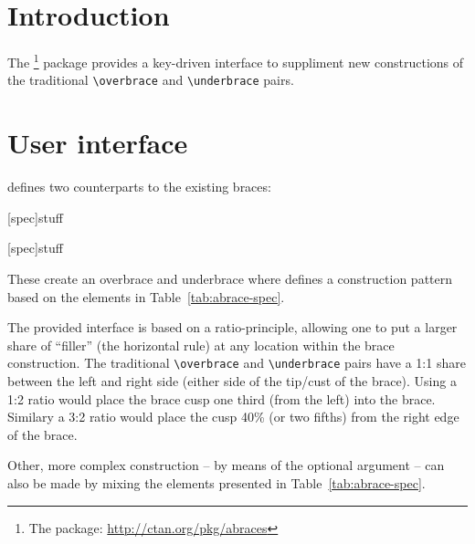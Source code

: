 \documentclass{ltxdockit}[2011/03/25]
\begin{document}
\printtitlepage

\section{Introduction} \label{intro}

The \footnote{The  package: \url{http://ctan.org/pkg/abraces}} package provides a key-driven interface to suppliment new constructions of the traditional \lstinline!\overbrace! and \lstinline!\underbrace! pairs.

\section{User interface} \label{user-interface}

 defines two counterparts to the existing braces:

\begin{ltxsyntax}

[spec]{stuff}

[spec]{stuff}

\end{ltxsyntax}

These create an overbrace and underbrace where  defines a construction pattern based on the elements in Table~\ref{tab:abrace-spec}.

The provided interface is based on a ratio-principle, allowing one to put a larger share of ``filler'' (the horizontal rule) at any location within the brace construction. The traditional \lstinline!\overbrace! and \lstinline!\underbrace! pairs have a \mbox{1:1} share between the left and right side (either side of the tip/cust of the brace). Using a \mbox{1:2} ratio would place the brace cusp one third (from the left) into the brace. Similary a \mbox{3:2} ratio would place the cusp 40\% (or two fifths) from the right edge of the brace.

Other, more complex construction -- by means of the optional  argument -- can also be made by mixing the elements presented in Table~\ref{tab:abrace-spec}.
\end{document}
